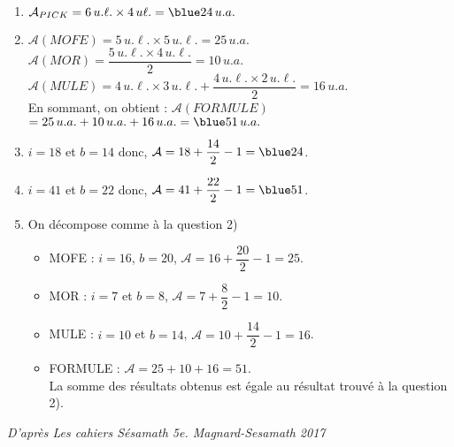 \begin{colonne*exercice}
\begin{corrige}
\bigskip
{}
\smallskip

\begin{enumerate}
   \item $\mathcal{A}_{PICK} =6\,u.\ell.\times4\,u\ell. ={\blue 24\,u.a.}$
   \item $\mathcal{A}(MOFE) =5\,u.\ell.\times5\,u.\ell. =25\,u.a.$ \\ [1mm] 
      $\mathcal{A}(MOR) =\dfrac{5\,u.\ell.\times4\,u.\ell.}{2} =10\,u.a.$ \\ [1mm]
      $\mathcal{A}(MULE) =4\,u.\ell.\times3\,u.\ell.+\dfrac{4\,u.\ell.\times2\,u.\ell.}{2} =16\,u.a.$ \\ [1mm]
      En sommant, on obtient : $\mathcal{A}(FORMULE)$ \\
      $=25\,u.a.+10\,u.a.+16\,u.a. ={\blue 51\,u.a.}$ \smallskip
   \item {\blue $i =18$} et {\blue $b =14$} donc, $\mathcal{A} =18+\dfrac{14}{2}-1 ={\blue 24}$. \smallskip
   \item {\blue $i =41$} et {\blue $b =22$} donc, $\mathcal{A} =41+\dfrac{22}{2}-1 ={\blue 51}$. \smallskip
   \item On décompose comme à la question 2)
   \begin{itemize}
      \item MOFE : $i =16$, $b =20$, $\mathcal{A} =16+\dfrac{20}{2}-1 =25$. \smallskip
      \item MOR : $i =7$ et $b =8$, $\mathcal{A} =7+\dfrac{8}{2}-1 =10$. \smallskip
      \item MULE : $i =10$ et $b =14$, $\mathcal{A} =10+\dfrac{14}{2}-1 =16$. \smallskip
      \item FORMULE : $\mathcal{A} =25+10+16 =51$. \\
         {\blue La somme des résultats obtenus est égale au résultat trouvé à la question 2).}
      \end{itemize}
   \end{enumerate}

\end{corrige}

\vfill\hfill {\footnotesize\it D'après Les cahiers Sésamath 5e. Magnard-Sesamath 2017}

\end{colonne*exercice}


\Recreation


\bigskip

